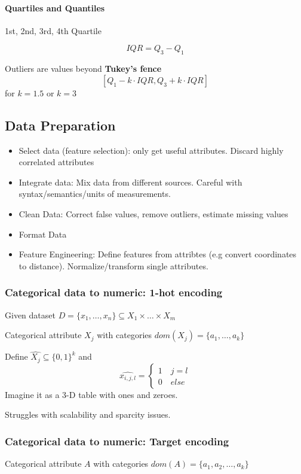 \documentclass{article}
\begin{document}
\paragraph{Quartiles and Quantiles} 1st, 2nd, 3rd, 4th Quartile

\[IQR = Q_3 - Q_1\]

Outliers are values beyond \textbf{Tukey's fence}
\[[Q_1-k\cdot IQR, Q_3 + k\cdot IQR]\]
for $k=1.5$ or $k=3$

\subsection{Data Preparation}
\begin{itemize}
  \item Select data (feature selection): only get useful attributes. Discard highly correlated attributes
  \item Integrate data: Mix data from different sources. Careful with syntax/semantics/units of measurements.
  \item Clean Data: Correct false values, remove outliers, estimate missing values
  \item Format Data
  \item Feature Engineering: Define features from attribtes (e.g convert coordinates to distance). Normalize/transform single attributes.
\end{itemize}
\subsubsection{Categorical data to numeric: 1-hot encoding}
Given dataset $D = \{x_1,\dots,x_n\} \subseteq X_1\times\dots\times X_m$

Categorical attribute $X_j$ with categories $dom(X_j) = \{a_1,\dots,a_k\}$

Define $\hat{X_j}\subseteq\{0,1\}^k$ and
\[\hat{x_{i,j,l}} = \begin{cases}
  1 \quad j = l\\
  0 \quad else
\end{cases}\]
Imagine it as a 3-D table with ones and zeroes.

Struggles with scalability and sparcity issues.

\subsubsection{Categorical data to numeric: Target encoding}
Categorical attribute $A$ with categories $dom(A) = \{a_1,a_2,\dots,a_k\}$
\end{document}
